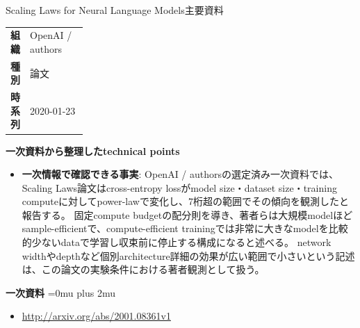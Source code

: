 \begin{technicalnote}{Scaling Laws for Neural Language Models}{主要資料}
\begingroup
\begin{tabularx}{\linewidth}{@{}>{\bfseries}p{0.22\linewidth}X@{}}
組織 & OpenAI / authors \\
種別 & 論文 \\
時系列 & 2020-01-23 \\
\end{tabularx}
\smallskip
{\bfseries 一次資料から整理したtechnical points}
\begin{itemize}[leftmargin=1.5em,itemsep=0.35em]
\item \textbf{一次情報で確認できる事実}: OpenAI / authorsの選定済み一次資料では、Scaling Laws論文はcross-entropy lossがmodel size・dataset size・training computeに対してpower-lawで変化し、7桁超の範囲でその傾向を観測したと報告する。 固定compute budgetの配分則を導き、著者らは大規模modelほどsample-efficientで、compute-efficient trainingでは非常に大きなmodelを比較的少ないdataで学習し収束前に停止する構成になると述べる。 network widthやdepthなど個別architecture詳細の効果が広い範囲で小さいという記述は、この論文の実験条件における著者観測として扱う。
\end{itemize}
\begin{minipage}{\linewidth}
\begin{samepage}
{\bfseries 一次資料}
\begingroup\sloppy
\Urlmuskip=0mu plus 2mu\relax
\begin{itemize}[leftmargin=1.5em,itemsep=0.25em]
\item {\scriptsize\url{http://arxiv.org/abs/2001.08361v1}}
\end{itemize}
\endgroup
\end{samepage}
\end{minipage}
\endgroup
\end{technicalnote}
\medskip

